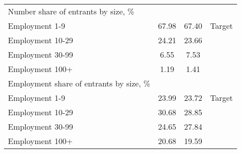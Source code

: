 \begin{tabular}{lccc}
    Number share of entrants by size, \% &       &       &        \\
             \hspace{10mm}Employment 1-9 & 67.98 & 67.40 & Target \\
           \hspace{10mm}Employment 10-29 & 24.21 & 23.66 &        \\
           \hspace{10mm}Employment 30-99 &  6.55 &  7.53 &        \\
            \hspace{10mm}Employment 100+ &  1.19 &  1.41 &        \\
Employment share of entrants by size, \% &       &       &        \\
             \hspace{10mm}Employment 1-9 & 23.99 & 23.72 & Target \\
           \hspace{10mm}Employment 10-29 & 30.68 & 28.85 &        \\
           \hspace{10mm}Employment 30-99 & 24.65 & 27.84 &        \\
            \hspace{10mm}Employment 100+ & 20.68 & 19.59 &        \\
\bottomrule
\end{tabular}
